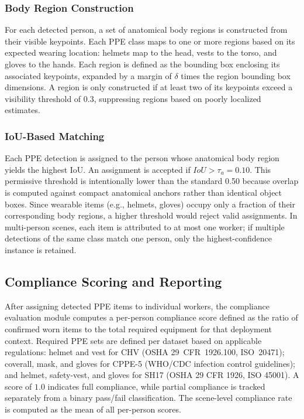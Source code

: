 \documentclass[conference,a4paper]{IEEEtran}
\begin{document}
\subsubsection{Body Region Construction}
For each detected person, a set of anatomical body regions is constructed from their visible keypoints. Each PPE class maps to one or more regions based on its expected wearing location: helmets map to the head, vests to the torso, and gloves to the hands. Each region is defined as the bounding box enclosing its associated keypoints, expanded by a margin of $\delta$ times the region bounding box dimensions. A region is only constructed if at least two of its keypoints exceed a visibility threshold of 0.3, suppressing regions based on poorly localized estimates.


\subsubsection{IoU-Based Matching} Each PPE detection is assigned to the person whose anatomical body region yields the highest IoU. An assignment is accepted if $IoU > \tau_a = 0.10$. This permissive threshold is intentionally lower than the standard 0.50 because overlap is computed against compact anatomical anchors rather than identical object boxes. Since wearable items (e.g., helmets, gloves) occupy only a fraction of their corresponding body regions, a higher threshold would reject valid assignments. In multi-person scenes, each item is attributed to at most one worker; if multiple detections of the same class match one person, only the highest-confidence instance is retained. 



\subsection{Compliance Scoring and Reporting}
After assigning detected PPE items to individual workers, the compliance evaluation module computes a per-person compliance score defined as the ratio of confirmed worn items to the total required equipment for that deployment context.  Required PPE sets are defined per dataset based on applicable regulations: helmet and vest for CHV (OSHA 29~CFR~1926.100, ISO~20471); coverall, mask, and gloves for CPPE-5 (WHO/CDC infection control guidelines); and helmet, safety-vest, and gloves for SH17 (OSHA 29 CFR 1926, ISO 45001).  A score of $1.0$ indicates full compliance, while partial compliance is tracked separately from a binary pass/fail classification.  The scene-level compliance rate is computed as the mean of all per-person scores.
\end{document}
